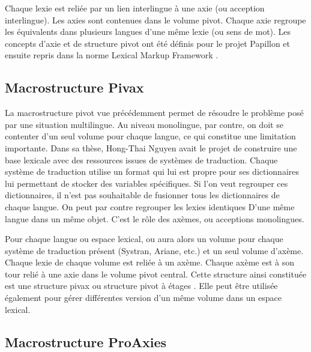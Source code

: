 \documentclass[10pt,a4paper,twoside]{article}
\begin{document}
Chaque lexie est reliée par un lien interlingue à une axie (ou acception interlingue). Les axies sont contenues dans le volume pivot. Chaque axie regroupe les équivalents dans plusieurs langues d'une même lexie (ou sens de mot).
Les concepts d'axie et de structure pivot ont été définis pour le projet Papillon et ensuite repris dans la norme Lexical Markup Framework \cite{Francopoulo09}.


\subsection{Macrostructure Pivax}

La macrostructure pivot vue précédemment permet de résoudre le problème posé par une situation multilingue. Au niveau monolingue, par contre, on doit se contenter d'un seul volume pour chaque langue, ce qui constitue une limitation importante. Dans sa thèse, Hong-Thai Nguyen \cite{thèseHTN} avait le projet de construire une base lexicale avec des ressources issues de systèmes de traduction. Chaque système de traduction utilise un format qui lui est propre pour ses dictionnaires lui permettant de stocker des variables spécifiques. Si l'on veut regrouper ces dictionnaires, il n'est pas souhaitable de fusionner tous les dictionnaires de chaque langue. On peut par contre regrouper les lexies identiques D'une même langue dans un même objet. C'est le rôle des axèmes, ou acceptions monolingues.

Pour chaque langue ou espace lexical, ou aura alors un volume pour chaque système de traduction présent (Systran, Ariane, etc.) et un seul volume d'axème. Chaque lexie de chaque volume est reliée à un axème. Chaque axème est à son tour relié à une axie dans le volume pivot central.
Cette structure ainsi constituée est une structure pivax ou structure pivot à étages \cite{MMHTN09}. Elle peut être utilisée également pour gérer différentes version d'un même volume dans un espace lexical.

\subsection{Macrostructure ProAxies}
\end{document}
